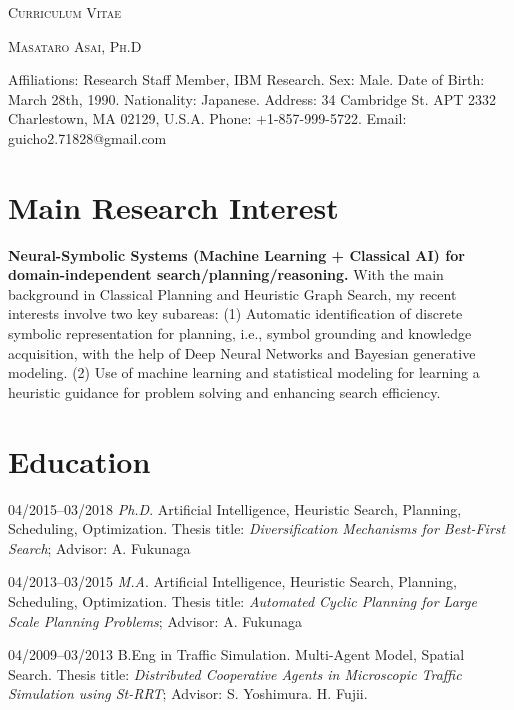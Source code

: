 \documentclass[letterpaper,11pt]{article}
\begin{document}
\pagestyle{empty}

\begin{center}
{\huge\textsc{Curriculum Vitae}}
\vspace{0.7\baselineskip}

{\Large\textsc{Masataro Asai, Ph.D}}
\vspace{0.5\baselineskip}

\small

 Affiliations: Research Staff Member, IBM Research.
 Sex: Male. Date of Birth: March 28th, 1990. Nationality: Japanese.
 Address: 34 Cambridge St. APT 2332 Charlestown, MA 02129, U.S.A.
 Phone: +1-857-999-5722.
 Email: guicho2.71828@gmail.com
\end{center}

\section{Main Research Interest}

\textbf{Neural-Symbolic Systems (Machine Learning + Classical AI) for domain-independent search/planning/reasoning.}
With the main background in Classical Planning and
Heuristic Graph Search, my recent interests involve two key subareas:
(1) Automatic identification of discrete symbolic representation for planning, i.e.,
symbol grounding and knowledge acquisition, with the help of Deep Neural Networks and Bayesian generative modeling.
(2) Use of machine learning and statistical modeling for learning a heuristic guidance for problem solving and enhancing search efficiency.


\section{Education}

\begin{CV}
 \item[04/2015--03/2018] \textit{Ph.D}.
 Artificial Intelligence, Heuristic Search, Planning, Scheduling, Optimization.
 Thesis title: \emph{Diversification Mechanisms for Best-First Search};
 Advisor: A. Fukunaga

 \item[04/2013--03/2015] \textit{M.A}.
 Artificial Intelligence, Heuristic Search, Planning, Scheduling, Optimization.
 Thesis title: \emph{Automated Cyclic Planning for Large Scale Planning Problems};
 Advisor: A. Fukunaga

 \item[04/2009--03/2013] B.Eng in Traffic Simulation.
 Multi-Agent Model, Spatial Search.
 Thesis title: \emph{Distributed Cooperative Agents in Microscopic Traffic Simulation using St-RRT};
 Advisor: S. Yoshimura. H. Fujii.
\end{CV}
\end{document}

